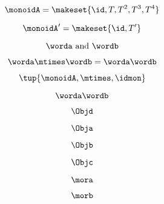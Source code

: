 {\begin{forslides}
        \begin{equation}
            \monoidA = \makeset{ \id, T, T^2, T^3, T^4 }
        \end{equation}

        \begin{equation}
            \monoidA' = \makeset{ \id, T' }
        \end{equation}

        \begin{equation}
            \worda \text{ and } \wordb
        \end{equation}

        \begin{equation}
            \label{eq:string-semigroup-wordab-2}
            \worda \mtimes  \wordb =  \worda \wordb
        \end{equation}

        \begin{equation}
            \tup{ \monoidA, \mtimes, \idmon}
        \end{equation}

        \begin{equation}
            \label{eq:string-semigroup-wordab-concat-2}
            \worda \wordb
        \end{equation}

        \begin{equation}
            \label{eq:00}
            \Objd
        \end{equation}

        \begin{equation}
            \label{eq:01}
            \Obja
        \end{equation}

        \begin{equation}
            \label{eq:02}
            \Objb
        \end{equation}

        \begin{equation}
            \label{eq:03}
            \Objc
        \end{equation}

        \begin{equation}
            \label{eq:04}
            \mora
        \end{equation}

        \begin{equation}
            \label{eq:05}
            \morb
        \end{equation}


\end{forslides}}
